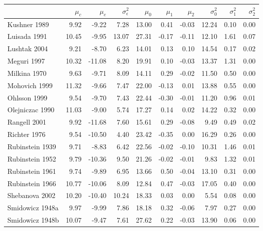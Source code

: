 \documentclass[12pt]{article}
\begin{document}
\begin{table}[H]
\centering
\begin{tabular}{lrrrrrrrrr}
\toprule
  & $\mu_c$ & $\mu_e$ & $\sigma^2_\epsilon$ & $\mu_0$ & $\mu_1$ & $\mu_2$ & $\sigma^2_0$ & $\sigma^2_1$ & $\sigma^2_2$\\
\midrule
\rowcolor{gray!6}  Kushner 1989 & 9.92 & -9.22 & 7.28 & 13.00 & 0.41 & -0.03 & 12.24 & 0.10 & 0.00\\
Luisada 1991 & 10.45 & -9.95 & 13.07 & 27.31 & -0.17 & -0.11 & 12.10 & 1.61 & 0.07\\
\rowcolor{gray!6}  Lushtak 2004 & 9.21 & -8.70 & 6.23 & 14.01 & 0.13 & 0.10 & 14.54 & 0.17 & 0.02\\
Meguri 1997 & 10.32 & -11.08 & 8.20 & 19.91 & 0.10 & -0.03 & 13.37 & 1.31 & 0.00\\
\rowcolor{gray!6}  Milkina 1970 & 9.63 & -9.71 & 8.09 & 14.11 & 0.29 & -0.02 & 11.50 & 0.50 & 0.00\\
\addlinespace
Mohovich 1999 & 11.32 & -9.66 & 7.47 & 22.00 & -0.13 & 0.01 & 13.88 & 0.55 & 0.00\\
\rowcolor{gray!6}  Ohlsson 1999 & 9.54 & -9.70 & 7.43 & 22.44 & -0.30 & -0.01 & 11.20 & 0.96 & 0.01\\
Olejniczac 1990 & 11.03 & -9.00 & 5.74 & 17.27 & 0.14 & 0.02 & 14.22 & 0.32 & 0.00\\
\rowcolor{gray!6}  Rangell 2001 & 9.92 & -11.68 & 7.60 & 15.61 & 0.29 & -0.08 & 9.49 & 0.49 & 0.02\\
Richter 1976 & 9.54 & -10.50 & 4.40 & 23.42 & -0.35 & 0.00 & 16.29 & 0.26 & 0.00\\
\addlinespace
\rowcolor{gray!6}  Rubinstein 1939 & 9.71 & -8.83 & 6.42 & 22.56 & -0.02 & -0.10 & 10.31 & 1.46 & 0.01\\
Rubinstein 1952 & 9.79 & -10.36 & 9.50 & 21.26 & -0.02 & -0.01 & 9.83 & 1.32 & 0.01\\
\rowcolor{gray!6}  Rubinstein 1961 & 9.74 & -9.89 & 6.95 & 13.66 & 0.50 & -0.04 & 13.10 & 0.31 & 0.00\\
Rubinstein 1966 & 10.77 & -10.06 & 8.09 & 12.84 & 0.47 & -0.03 & 17.05 & 0.40 & 0.00\\
\rowcolor{gray!6}  Shebanova 2002 & 10.20 & -10.40 & 10.24 & 18.33 & 0.03 & 0.00 & 5.54 & 0.08 & 0.00\\
\addlinespace
Smidowicz 1948a & 9.97 & -9.99 & 7.86 & 18.18 & 0.32 & -0.06 & 7.97 & 0.27 & 0.00\\
\rowcolor{gray!6}  Smidowicz 1948b & 10.07 & -9.47 & 7.61 & 27.62 & 0.22 & -0.03 & 13.90 & 0.06 & 0.00\\

\end{tabular}
\end{table}
\end{document}
